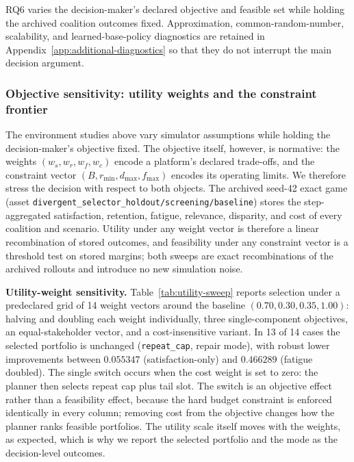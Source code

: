 \documentclass[review]{elsarticle}
\theoremstyle{plain}
\theoremstyle{definition}
\theoremstyle{remark}
\begin{document}
RQ6 varies the decision-maker's declared objective and feasible set while holding the archived coalition outcomes fixed. Approximation, common-random-number, scalability, and learned-base-policy diagnostics are retained in Appendix~\ref{app:additional-diagnostics} so that they do not interrupt the main decision argument.

\subsubsection{Objective sensitivity: utility weights and the constraint frontier}\label{sec:objective-sensitivity}

The environment studies above vary simulator assumptions while holding the decision-maker's objective fixed. The objective itself, however, is normative: the weights $(w_s,w_r,w_f,w_c)$ encode a platform's declared trade-offs, and the constraint vector $(B,r_{\min},d_{\max},f_{\max})$ encodes its operating limits. We therefore stress the decision with respect to both objects. The archived seed-42 exact game (asset \texttt{divergent\_selector\_holdout/screening/baseline}) stores the step-aggregated satisfaction, retention, fatigue, relevance, disparity, and cost of every coalition and scenario. Utility under any weight vector is therefore a linear recombination of stored outcomes, and feasibility under any constraint vector is a threshold test on stored margins; both sweeps are exact recombinations of the archived rollouts and introduce no new simulation noise.

\textbf{Utility-weight sensitivity.} Table~\ref{tab:utility-sweep} reports selection under a predeclared grid of 14 weight vectors around the baseline $(0.70,0.30,0.35,1.00)$: halving and doubling each weight individually, three single-component objectives, an equal-stakeholder vector, and a cost-insensitive variant. In 13 of 14 cases the selected portfolio is unchanged (\texttt{repeat\_cap}, repair mode), with robust lower improvements between $0.055347$ (satisfaction-only) and $0.466289$ (fatigue doubled). The single switch occurs when the cost weight is set to zero: the planner then selects repeat cap plus tail slot. The switch is an objective effect rather than a feasibility effect, because the hard budget constraint is enforced identically in every column; removing cost from the objective changes how the planner ranks feasible portfolios. The utility scale itself moves with the weights, as expected, which is why we report the selected portfolio and the mode as the decision-level outcomes.
\end{document}
